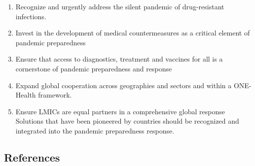 \documentclass[
  11pt,
  paper=a4,
  ,captions=tableheading
]{scrartcl}
\begin{document}
\begin{enumerate}
\def\labelenumi{\arabic{enumi}.}
\item
  Recognize and urgently address the silent pandemic of drug-resistant
  infections.
\item
  Invest in the development of medical countermeasures as a critical
  element of pandemic preparedness
\item
  Ensure that access to diagnostics, treatment and vaccines for all is a
  cornerstone of pandemic preparedness and response
\item
  Expand global cooperation across geographies and sectors and within a
  ONE-Health framework.
\item
  Ensure LMICs are equal partners in a comprehensive global response
  Solutions that have been pioneered by countries should be recognized
  and integrated into the pandemic preparedness response.
\end{enumerate}

\newpage

\hypertarget{references}{%
\subsection*{References}\label{references}}
\end{document}
